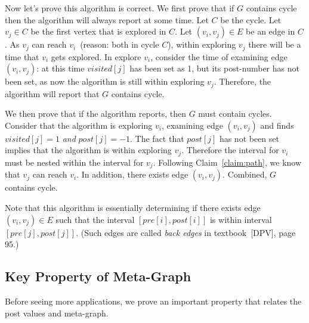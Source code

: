 \begin{minipage}{0.8\textwidth}
	\xxx
	\xxx
	\xxx
	\xxx
	\xxx
	\xxx
	\aac {\textcolor{red}{else if ($post[j] = -1$): report ``$G$ contains cycle''};}\xxx
	\xxx
	\xxx
	\xxx
	\xxx
	\xxx
\end{minipage}


Now let's prove this algorithm is correct.
We first prove that if $G$ contains cycle then the algorithm will always report at some time.
Let $C$ be the cycle.
Let $v_j \in C$ be the first vertex that is explored in $C$.
Let $(v_i, v_j) \in E$ be an edge in $C$.
As $v_j$ can reach $v_i$~(reason: both in cycle $C$), 
within exploring $v_j$ there will be a time that $v_i$ gets explored.
In explore $v_i$, consider the time of examining edge $(v_i,v_j)$: at this time $visited[j]$ has been set as 1,
but its post-number has not been set, as now the algorithm is still within exploring $v_j$.
Therefore, the algorithm will report that $G$ contains cycle. 

We then prove that if the algorithm reports, then $G$ must contain cycles.
Consider that the algorithm is exploring $v_i$, examining edge $(v_i, v_j)$ and 
finds $visited[j] = 1$ \emph{and} $post[j] = -1$.
The fact that $post[j]$ has not been set implies that the algorithm is within exploring $v_j$.
Therefore the interval for $v_i$ must be nested within the interval for $v_j$.
Following Claim~\ref{claim:path}, we know that $v_j$ can reach $v_i$.
In addition, there exists edge $(v_i, v_j)$. Combined, $G$ contains cycle.

Note that this algorithm is essentially determining if there exists edge $(v_i, v_j) \in E$
such that the interval $[pre[i], post[i]]$ is within interval $[pre[j], post[j]]$.
(Such edges are called \emph{back edges} in textbook~[DPV], page 95.)

\subsection*{Key Property of Meta-Graph}

Before seeing more applications, we prove an important property that relates the
post values and meta-graph.

